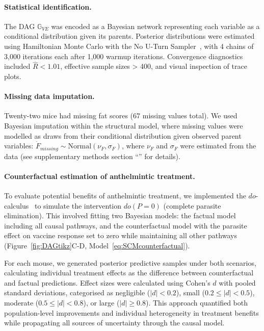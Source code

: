 \documentclass[a4paper, hidelinks, 11pt]{article}
\begin{document}
\paragraph{Statistical identification.} The DAG $\mathbb{G}_{VE}$ was encoded as a Bayesian network representing each variable as a conditional distribution given its parents. Posterior distributions were estimated using Hamiltonian Monte Carlo with the No U-Turn Sampler~\cite{Hoffman2014}, with 4 chains of 3,000 iterations each after 1,000 warmup iterations. Convergence diagnostics included $\hat{R} < 1.01$, effective sample sizes > 400, and visual inspection of trace plots.

\paragraph{Missing data imputation.} Twenty-two mice had missing fat scores (67 missing values total). We used Bayesian imputation within the structural model, where missing values were modelled as draws from their conditional distribution given observed parent variables: $\dot{F}_{missing} \sim \text{Normal}(\nu_F, \sigma_F)$, where $\nu_F$ and $\sigma_F$ were estimated from the data (see supplementary methods section ``'' for details).

\paragraph{Counterfactual estimation of anthelmintic treatment.} To evaluate potential benefits of anthelmintic treatment, we implemented the $do$-calculus~\cite{Pearl2009b} to simulate the intervention $do(P=0)$ (complete parasite elimination). This involved fitting two Bayesian models: the factual model including all causal pathways, and the counterfactual model with the parasite effect on vaccine response set to zero while maintaining all other pathways (Figure~\ref{fig:DAGtikz}C-D, Model~\ref{eq:SCMcounterfactual}).

For each mouse, we generated posterior predictive samples under both scenarios, calculating individual treatment effects as the difference between counterfactual and factual predictions. Effect sizes were calculated using Cohen's $d$ with pooled standard deviations, categorised as negligible ($|d| < 0.2$), small ($0.2 \leq |d| < 0.5$), moderate ($0.5 \leq |d| < 0.8$), or large ($|d| \geq 0.8$). This approach quantified both population-level improvements and individual heterogeneity in treatment benefits while propagating all sources of uncertainty through the causal model.
\end{document}
